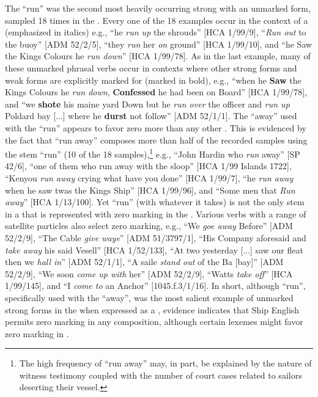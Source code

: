 The  “run” was the second most heavily occurring strong  with an unmarked  form, sampled 18 times in the . Every one of the 18 examples occur in the context of a  (emphasized in italics) e.g., “he \textit{run up} the shrouds” [HCA 1/99/9], “\textit{Run out} to the buoy” [ADM 52/2/5], “they \textit{run} her \textit{on} ground” [HCA 1/99/10], and “he Saw the Kings Colours he \textit{run down}” [HCA 1/99/78]. As in the last example, many of these unmarked phrasal verbs occur in contexts where other strong  forms and weak  forms are explicitly marked for  (marked in bold), e.g., “when he \textbf{Saw} the Kings Colours he \textit{run down}, \textbf{Confessed} he had been on Board” [HCA 1/99/78], and “we \textbf{shote} his maine yard Down but he \textit{run over} the officer and \textit{run up} Poldard bay [...] where he \textbf{durst} not follow” [ADM 52/1/1]. The  “away” used with the  “run” appears to favor zero  more than any other . This is evidenced by the fact that “run away” composes more than half of the recorded samples using the  stem “run” (10 of the 18 samples),\footnote{The high frequency of “run away” may, in part, be explained by the nature of witness testimony coupled with the number of court cases related to sailors deserting their vessel.} e.g., “John Hardin who \textit{run} away” [SP 42/6], “one of them who run away with the sloop” [HCA 1/99  Islands 1722], “Kenyou \textit{run away} crying what have you done” [HCA 1/99/7], “he \textit{run away} when he saw twas the Kings Ship” [HCA 1/99/96], and “Some men that \textit{Run away}” [HCA 1/13/100]. Yet “run” (with whatever  it takes) is not the only  stem in a  that is represented with zero marking in the . Various  verbs with a range of satellite particles also select zero marking, e.g., “We \textit{goe away} Before” [ADM 52/2/9], “The Cable \textit{give waye}” [ADM 51/3797/1], “His Company aforesaid and \textit{take away} his said Vesell” [HCA 1/52/133], “At two yesterday [...] saw our fleat then we \textit{hall in}” [ADM 52/1/1], “A saile \textit{stand out} of the Ba [bay]” [ADM 52/2/9], “We soon \textit{come up with} her” [ADM 52/2/9], “Watts \textit{take off}” [HCA 1/99/145], and “I \textit{come to} an Anchor” [1045.f.3/1/16]. In short, although “run”, specifically used with the  “away”, was the most salient example of unmarked strong  forms in the  when expressed as a , evidence indicates that Ship English permits zero marking in any  composition, although certain lexemes might favor zero marking in . 

